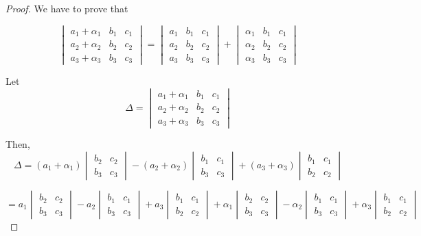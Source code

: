 \begin{proof}
  We have to prove that

$$\begin{vmatrix}a_1 + \alpha_1 & b_1 & c_1\\a_2 + \alpha_2 & b_2 & c_2\\
a_3 + \alpha_3 & b_3 & c_3\end{vmatrix} = \begin{vmatrix}a_1 & b_1 & c_1\\a_2 &
b_2 & c_2 \\ a_3 & b_3 & c_3\end{vmatrix} + \begin{vmatrix}\alpha_1 & b_1 & c_1\\\alpha_2 &
b_2 & c_2 \\ \alpha_3 & b_3 & c_3\end{vmatrix}$$

Let $$\Delta = \begin{vmatrix}a_1 + \alpha_1 & b_1 & c_1\\a_2 + \alpha_2 &
b_2 & c_2\\ a_3 + \alpha_3 & b_3 & c_3\end{vmatrix}$$

Then, $$\Delta = (a_1 + \alpha_1)\begin{vmatrix}b_2 & c_2 \\ b_3 &
c_3\end{vmatrix} - (a_2 + \alpha_2)\begin{vmatrix}b_1 & c_1\\b_3 &
c_3\end{vmatrix} + (a_3 + \alpha_3)\begin{vmatrix}b_1 & c_1\\b_2 &
c_2\end{vmatrix}$$

$$= a_1\begin{vmatrix}b_2 & c_2 \\ b_3 & c_3\end{vmatrix} -
a_2\begin{vmatrix}b_1 & c_1\\b_3 & c_3\end{vmatrix} + a_3\begin{vmatrix}b_1 & c_1\\b_2 &
c_2\end{vmatrix} + \alpha_1\begin{vmatrix}b_2 & c_2 \\ b_3 & c_3\end{vmatrix} -
\alpha_2\begin{vmatrix}b_1 & c_1\\b_3 & c_3\end{vmatrix} + \alpha_3\begin{vmatrix}b_1 & c_1\\b_2 &
c_2\end{vmatrix}$$


\end{proof}
